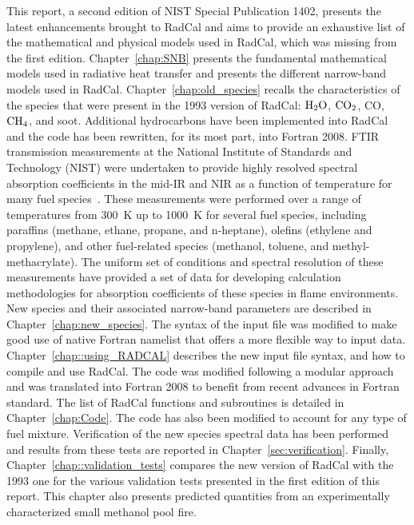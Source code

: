 This report, a second edition of NIST Special Publication 1402, presents the latest enhancements brought to RadCal and aims to provide an exhaustive list of the mathematical and physical models used in RadCal, which was missing from the first edition. Chapter~\ref{chap:SNB} presents the fundamental mathematical models used in radiative heat transfer and presents the different narrow-band models used in RadCal. Chapter~\ref{chap:old_species} recalls the characteristics of the species that were present in the 1993 version of RadCal: $\rm H_2O$, $\rm CO_2$, CO, $\rm CH_4$, and soot. Additional hydrocarbons have been implemented into RadCal and the code has been rewritten, for its most part, into Fortran 2008. FTIR transmission measurements at the National Institute of Standards and Technology (NIST) were undertaken to provide highly resolved spectral absorption coefficients in the mid-IR and NIR as a function of temperature for many fuel species~\cite{Wakatsuki2005a,Wakatsuki2008,Yilmaz2008}. These measurements were performed over a range of temperatures from 300~K up to 1000~K for several fuel species, including paraffins (methane, ethane, propane, and n-heptane), olefins (ethylene and propylene), and other fuel-related species (methanol, toluene, and methyl-methacrylate). The uniform set of conditions and spectral resolution of these measurements have provided a set of data for developing calculation methodologies for absorption coefficients of these species in flame environments. New species and their associated narrow-band parameters are described in Chapter~\ref{chap:new_species}. The syntax of the input file was modified to make good use of native Fortran namelist that offers a more flexible way to input data. Chapter~\ref{chap::using_RADCAL} describes the new input file syntax, and how to compile and use RadCal. The code was modified following a modular approach and was translated into Fortran 2008 to benefit from recent advances in Fortran standard. The list of RadCal functions and subroutines is detailed in Chapter~\ref{chap:Code}.  The code has also been modified to account for any type of fuel mixture. Verification of the new species spectral data has been performed and results from these tests are reported in Chapter~\ref{sec:verification}. Finally, Chapter~\ref{chap::validation_tests} compares the new version of RadCal with the 1993 one for the various validation tests presented in the first edition of this report. This chapter also presents predicted quantities from an experimentally characterized small methanol pool fire.



